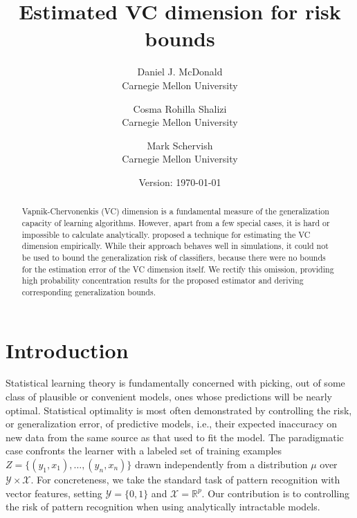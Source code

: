 \documentclass[11pt]{article}
\title{Estimated VC dimension for risk bounds}
\author{Daniel J. McDonald\\Carnegie Mellon
  University\\\email{danielmc@cmu.edu} \and Cosma Rohilla
  Shalizi\\Carnegie Mellon University\\\email{cshalizi@cmu.edu}
  \and Mark Schervish\\Carnegie Mellon
  University\\\email{mark@cmu.edu}}
\date{Version: \today}
\newcommand{\R}{\mathbb{R}}
\begin{document}
\maketitle

\begin{abstract}
  Vapnik-Chervonenkis (VC) dimension is a fundamental measure of the
  generalization capacity of learning algorithms.  However, apart from a few
  special cases, it is hard or impossible to calculate
  analytically. \citet{VapnikLevin1994} proposed a technique for estimating the
  VC dimension empirically.  While their approach behaves well in simulations,
  it could not be used to bound the generalization risk of classifiers, because
  there were no bounds for the estimation error of the VC dimension itself. We
  rectify this omission, providing high probability concentration results for
  the proposed estimator and deriving corresponding generalization bounds.
\end{abstract}


\section{Introduction}
\label{sec:introduction}

Statistical learning theory is fundamentally concerned with picking, out of
some class of plausible or convenient models, ones whose predictions will be
nearly optimal.  Statistical optimality is most often demonstrated by
controlling the risk, or generalization error, of predictive models, i.e.,
their expected inaccuracy on new data from the same source as that used to fit
the model.  The paradigmatic case confronts the learner with a labeled set of
training examples $Z=\{(y_1,x_1),\ldots,(y_n,x_n)\}$ drawn independently from a
distribution $\mu$ over $\mathcal{Y} \times \mathcal{X}$. For concreteness, we
take the standard task of pattern recognition with vector features, setting
$\mathcal{Y}=\{0,1\}$ and $\mathcal{X}=\R^p$.  Our contribution is to
controlling the risk of pattern recognition when using analytically intractable
models.
\end{document}
